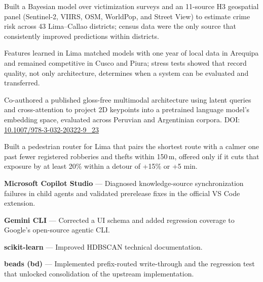 \documentclass[10pt,a4paper]{article}
\begin{document}
\begin{cvitems}
  \item {} Built a Bayesian model over victimization surveys and an 11-source H3 geospatial
  panel (Sentinel-2, VIIRS, OSM, WorldPop, and Street View) to estimate crime risk across 43 Lima--Callao districts;
  census data were the only source that consistently improved predictions within districts.
  \item {} Features learned in Lima matched models with one year of local data in Arequipa and
  remained competitive in Cusco and Piura; stress tests showed that record quality, not only architecture, determines
  when a system can be evaluated and transferred.
\end{cvitems}

\begin{cvitems}
  \item Co-authored a published gloss-free multimodal architecture using latent queries and cross-attention to project 2D
  keypoints into a pretrained language model's embedding space, evaluated across Peruvian and Argentinian corpora.
  DOI: \href{https://doi.org/10.1007/978-3-032-20322-9_23}{10.1007/978-3-032-20322-9\_23}
\end{cvitems}

\begin{cvitems}
  \item Built a pedestrian router for Lima that pairs the shortest route with a calmer one past fewer registered
  robberies and thefts within 150\,m, offered only if it cuts that exposure by at least 20\% within a detour of +15\%
  or +5 min.
\end{cvitems}

\begin{cvitems}
  \item \textbf{Microsoft Copilot Studio} --- Diagnosed knowledge-source synchronization failures in child agents and
  validated prerelease fixes in the official VS Code extension.
  \item \textbf{Gemini CLI} --- Corrected a UI schema and added regression coverage to Google's open-source agentic CLI.
  \item \textbf{scikit-learn} --- Improved HDBSCAN technical documentation.
  \item \textbf{beads (bd)} --- Implemented prefix-routed write-through and the regression test that unlocked consolidation
  of the upstream implementation.
\end{cvitems}
\end{document}
